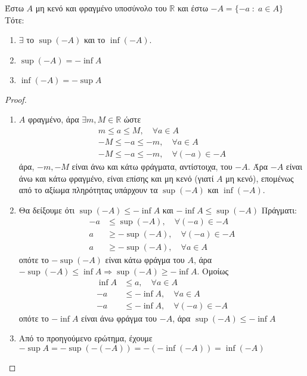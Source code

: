 \begin{mybox3}
\begin{prop}
  Έστω $ A $ μη κενό και φραγμένο υποσύνολο του $ \mathbb{R} $ και έστω 
  $ -A = \{ -a \; : \; a \in A \} $ Τότε:
  \begin{enumerate}
    \item $ \exists $ το $ \sup (-A) $ και το $ \inf (-A) $.
    \item $ \sup (-A) = - \inf A $
    \item $ \inf (-A) = - \sup A $
  \end{enumerate}
\end{prop}
\end{mybox3}
\begin{proof}
\item {}
  \begin{enumerate}
    \item $ A $ φραγμένο, άρα $ \exists m,M \in \mathbb{R} $ ώστε 
      \begin{gather*} 
        m  \leq  a \leq M, \quad \forall a \in A \\
        -M  \leq - a \leq -m, \quad \forall a \in A \\
        -M  \leq - a \leq -m, \quad \forall (-a) \in -A 
      \end{gather*}
      άρα, $ -m,-M $ είναι άνω και κάτω φράγματα, αντίστοιχα, του $ -A $. Άρα 
      $ -A $ είναι άνω και κάτω φραγμένο, είναι επίσης και μη κενό (γιατί $A$ μη κενό), 
      επομένως από το αξίωμα πληρότητας υπάρχουν τα $ \sup (-A) $ και $ \inf (-A) $.
    \item Θα δείξουμε ότι $ \sup (-A) \leq - \inf A $ και $ - \inf A \leq \sup (-A) $
      Πράγματι:
      \begin{align*}
        -a &\leq \sup (-A), \quad \forall (-a) \in -A \\
        a &\geq -\sup (-A), \quad \forall (-a) \in -A \\
        a &\geq -\sup (-A), \quad \forall a \in A 
      \end{align*}
      οπότε το $ -\sup(-A) $ είναι κάτω φράγμα του $A$, άρα $ - \sup (-A) \leq \inf A
      \Rightarrow \sup (-A) \geq -\inf A $. Ομοίως 
      \begin{align*}
        \inf A &\leq a, \quad \forall a \in A \\
        - a &\leq - \inf A, \quad \forall a \in A \\
        - a &\leq - \inf A, \quad \forall (-a) \in -A 
      \end{align*}
      οπότε το $ - \inf A $ είναι άνω φράγμα του $ -A $, άρα $ \sup (-A) \leq - \inf
      A $
    \item Από το προηγούμενο ερώτημα, έχουμε $ - \sup A = - \sup (-(-A)) = - (- \inf (-A)) = \inf (-A) $ 
  \end{enumerate}
\end{proof}



